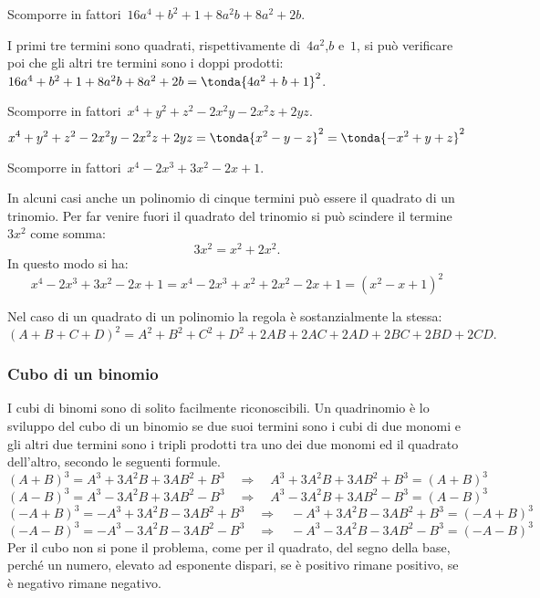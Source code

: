  \begin{esempio}
Scomporre in fattori~\(16a^{4}+b^{2}+1+8a^{2}b+8a^{2}+2b\).

I primi tre termini sono quadrati, rispettivamente di~\(4a^{2}\),\(b\) 
e~\(1\), si può verificare poi che gli altri tre termini sono i doppi 
prodotti:~\(16a^{4}+b^{2}+1+8a^{2}b+8a^{2}+2b=\tonda{4a^{2}+b+1}^{2}\).
 \end{esempio}

 \begin{esempio}
Scomporre in fattori~\(x^4+y^{2}+z^{2}-2x^2y-2x^2z+2yz\).
\[x^4+y^{2}+z^{2}-2x^2y-2x^2z+2yz=
  \tonda{x^2-y-z}^{2}=\tonda{-x^2+y+z}^{2}\]
 \end{esempio}

 \begin{esempio}
Scomporre in fattori~\(x^4-2x^3+3x^2-2x+1\).

In alcuni casi anche un polinomio di cinque termini può essere il quadrato di 
un trinomio.
Per far venire fuori il quadrato del trinomio si può scindere il 
termine~\(3x^2\) come somma:
\[3x^2=x^2+2x^2.\]
In questo modo si ha:
\[x^4-2x^3+3x^2-2x+1=x^4-2x^3+x^2+2x^2-2x+1=(x^2-x+1)^{2}\]
 \end{esempio}

Nel caso di un quadrato di un polinomio la regola è sostanzialmente la stessa:
\begin{equation*}
(A+B+C+D)^{2}=A^{2}+B^{2}+C^{2}+D^{2}+2AB+2AC+2AD+2BC+2BD+2CD.
\end{equation*}

\subsubsection{Cubo di un binomio}
\label{subsubsec:divpol_cubobin}

I cubi di binomi sono di solito facilmente riconoscibili. Un quadrinomio è lo 
sviluppo del cubo di un binomio se due suoi termini sono i cubi di due monomi 
e gli altri due termini sono i tripli prodotti tra uno dei due monomi ed il 
quadrato dell'altro, secondo le seguenti formule.
\[(A+B)^{3}=A^{3}+3A^{2}B+3AB^{2}+B^{3}\quad \Rightarrow \quad 
A^{3}+3A^{2}B+3AB^{2}+B^{3}=(A+B)^{3}\]
\[(A-B)^{3}=A^{3}-3A^{2}B+3AB^{2}-B^{3}\quad \Rightarrow \quad 
A^{3}-3A^{2}B+3AB^{2}-B^{3}=(A-B)^{3}\]
\[(-A+B)^{3}=-A^{3}+3A^{2}B-3AB^{2}+B^{3}\quad \Rightarrow \quad 
-A^{3}+3A^{2}B-3AB^{2}+B^{3}=(-A+B)^{3}\]
\[(-A-B)^{3}=-A^{3}-3A^{2}B-3AB^{2}-B^{3}\quad \Rightarrow \quad 
-A^{3}-3A^{2}B-3AB^{2}-B^{3}=(-A-B)^{3}\]
Per il cubo non si pone il problema, come per il quadrato, del segno della 
base, perché un numero, elevato ad esponente dispari, se è positivo rimane 
positivo, se è negativo rimane negativo.

